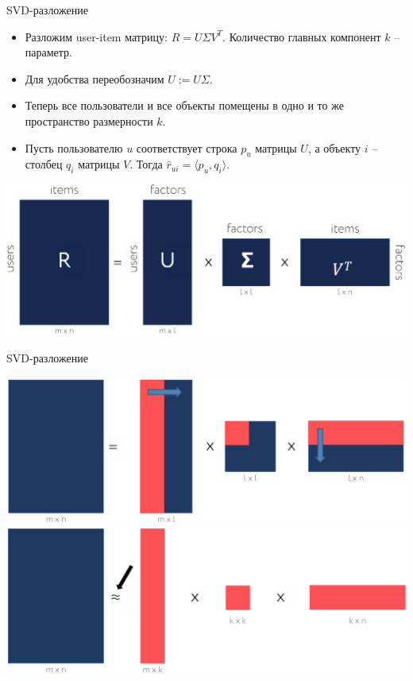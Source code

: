 \documentclass[9pt]{beamer}
\begin{document}
\begin{frame}{SVD-разложение}
\begin{itemize}
    \item Разложим user-item матрицу: $R = U\Sigma V^T$. Количество главных компонент $k$ -- параметр.
    \item Для удобства переобозначим $U := U\Sigma$.
    \item Теперь все пользователи и все объекты помещены в одно и то же пространство размерности $k$.
    \item Пусть пользователю $u$ соответствует строка $p_u$ матрицы $U$, а объекту $i$ -- столбец $q_i$ матрицы $V$. Тогда $\hat r_{ui} = \langle p_u, q_i \rangle$.
\end{itemize}
\begin{center}
    \includegraphics[height=0.35\textheight]{img/svd_user_item.png}
\end{center}
\end{frame}

\begin{frame}{SVD-разложение}
\begin{center}
    \includegraphics[height=0.35\textheight]{img/svd_user_item_1.png}
    \includegraphics[height=0.35\textheight]{img/svd_user_item_2.png}
\end{center}
\end{frame}
\end{document}
